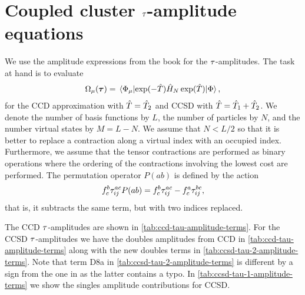     \section{Coupled cluster $\tau$-amplitude equations}
        \label{app:cc-tau-amplitudes}
        We use the amplitude expressions from the book
         \cite{shavitt2009many} for the
        $\tau$-amplitudes.
        The task at hand is to evaluate
        \begin{align}
            \Omega_{\mu}(\vfg{\clustamp})
            = \mel*{\slat_{\mu}}{
                \exponential(-\clust)
                \hamil_N
                \exponential(\clust)
            }{\slat},
        \end{align}
        for the CCD approximation with $\hat{T} = \hat{T}_2$ and CCSD with $\hat{T}
        = \hat{T}_1 + \hat{T}_2$.
        We denote the number of basis functions by $L$, the number of particles
        by $N$, and the number virtual states by $M = L - N$.
        We assume that $N < L / 2$ so that it is better to replace a contraction
        along a virtual index with an occupied index.
        Furthermore, we assume that the tensor contractions are performed as
        binary operations where the ordering of the contractions involving the
        lowest cost are performed.
        The permutation operator $P(ab)$ is defined by the action
        \begin{align}
            f^{b}_{c} \tau^{ac}_{ij} P(ab)
            =
            f^{b}_{c} \tau^{ac}_{ij}
            -
            f^{a}_{c} \tau^{bc}_{ij},
        \end{align}
        that is, it subtracts the same term, but with two indices replaced.

        The CCD $\tau$-amplitudes are shown in
        \autoref{tab:ccd-tau-amplitude-terms}.
        For the CCSD $\tau$-amplitudes we have the doubles amplitudes from
        CCD in \autoref{tab:ccd-tau-amplitude-terms} along with the new doubles
        terms in \autoref{tab:ccsd-tau-2-amplitude-terms}.
        Note that term D8a in \autoref{tab:ccsd-tau-2-amplitude-terms} is
        different by a sign from the one in  as the
        latter contains a typo.
        In \autoref{tab:ccsd-tau-1-amplitude-terms} we show the singles
        amplitude contributions for CCSD.

